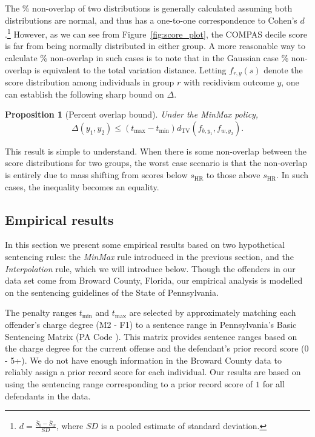 \documentclass[11pt, svgnames]{article}
\numberwithin{equation}{section}
\theoremstyle{plain}
\newtheorem{prop}{Proposition}
\theoremstyle{definition}
\numberwithin{prop}{section}
\numberwithin{corollary}{section}
\begin{document}
  The \% non-overlap of two distributions is generally calculated assuming both distributions are normal, and thus has a one-to-one correspondence to Cohen's $d$ \cite{cohen1988}.\footnote{$d = \frac{\bar S_b - \bar S_w}{SD}$, where $SD$ is a pooled estimate of standard deviation.} However, as we can see from Figure~\ref{fig:score_plot}, the COMPAS decile score is far from being normally distributed in either group.  A more reasonable way to calculate \% non-overlap in such cases is to note that in the Gaussian case \% non-overlap is equivalent to the total variation distance.  Letting $f_{r,y}(s)$ denote the score distribution among individuals in group $r$ with recidivism outcome $y$, one can establish the following sharp bound on $\Delta$.
%  
\begin{prop}[Percent overlap bound]
  Under the MinMax policy,
  \[
  \Delta(y_1, y_2) \le  (t_\mathrm{max} - t_\mathrm{min}) d_\mathrm{TV}(f_{b,y_1}, f_{w,y_2}).
  \]
  \label{prop:overlap}
\end{prop}

\vspace{-3em}

This result is simple to understand.  When there is some non-overlap between the score distributions for two groups, the worst case scenario is that the non-overlap is entirely due to mass shifting from scores below $s_\mathrm{HR}$ to those above $s_\mathrm{HR}$.  In such cases, the inequality becomes an equality.  



\subsection{Empirical results} \label{sec:empirical}

In this section we present some empirical results based on two hypothetical sentencing rules: the \emph{MinMax} rule introduced in the previous section, and the \emph{Interpolation} rule, which we will introduce below.  Though the offenders in our data set come from Broward County, Florida, our empirical analysis is modelled on the sentencing guidelines of the State of Pennsylvania. 

The penalty ranges $t_\mathrm{min}$ and $t_\mathrm{max}$ are selected by approximately matching each offender's charge degree (M2 - F1) to a sentence range in Pennsylvania's Basic Sentencing Matrix (PA Code ).  This matrix provides sentence ranges based on the charge degree for the current offense and the defendant's prior record score (0 - 5+).  We do not have enough information in the Broward County data to reliably assign a prior record score for each individual.  Our results are based on using the sentencing range corresponding to a prior record score of $1$ for all defendants in the data.  
\end{document}
